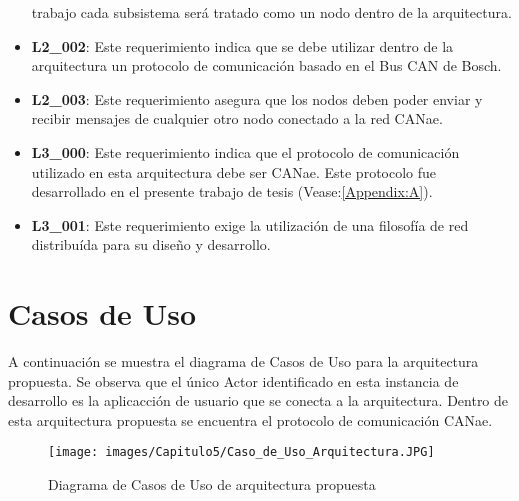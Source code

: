 \begin{itemize}
  trabajo cada subsistema será tratado como un nodo dentro de la arquitectura.
\item\textbf{L2\_002}: Este requerimiento indica que se debe utilizar dentro de
  la arquitectura un protocolo de comunicación basado en el Bus CAN de Bosch.
\item\textbf{L2\_003}: Este requerimiento asegura que los nodos deben poder enviar
  y recibir mensajes de cualquier otro nodo conectado a la red CANae.
\item\textbf{L3\_000}: Este requerimiento indica que el protocolo de
  comunicación utilizado en esta arquitectura debe ser CANae. Este protocolo
  fue desarrollado en el presente trabajo de tesis (Vease:\ref{Appendix:A}).
\item\textbf{L3\_001}: Este requerimiento exige la utilización de una
  filosofía de red distribuída para su diseño y desarrollo.
\end{itemize}

\section{Casos de Uso}
A continuación se muestra el diagrama de Casos de Uso para la arquitectura propuesta.
Se observa que el único Actor identificado en esta instancia de desarrollo es
la aplicacción de usuario que se conecta a la arquitectura.  Dentro de esta
arquitectura propuesta se encuentra el protocolo de comunicación CANae.

\begin{figure}[h!]
 \centering
 \texttt{[image: images/Capitulo5/Caso\_de\_Uso\_Arquitectura.JPG]}
  \caption{Diagrama de Casos de Uso de arquitectura propuesta}
\label{fig:DiagramaCUArqPropuesta}
\end{figure} 

